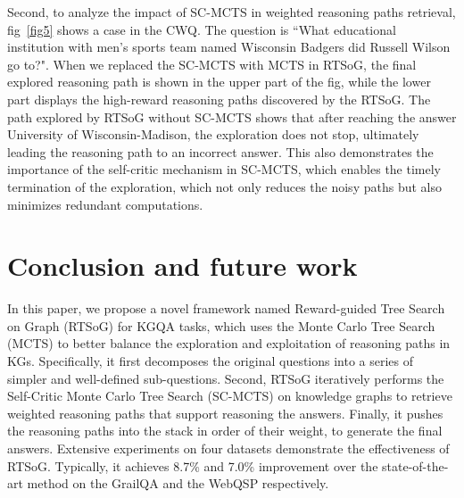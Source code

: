 \documentclass[lettersize,journal]{IEEEtran}
\begin{document}
Second, to analyze the impact of SC-MCTS in weighted reasoning paths retrieval, fig~\ref{fig5} shows a case in the CWQ. The question is ``What educational institution with men's sports team named Wisconsin Badgers did Russell Wilson go to?". When we replaced the SC-MCTS with MCTS in RTSoG, the final explored reasoning path is shown in the upper part of the fig, while the lower part displays the high-reward reasoning paths discovered by the RTSoG. The path explored by RTSoG without SC-MCTS shows that after reaching the answer University of Wisconsin-Madison, the exploration does not stop, ultimately leading the reasoning path to an incorrect answer. This also demonstrates the importance of the self-critic mechanism in SC-MCTS, which enables the timely termination of the exploration, which not only reduces the noisy paths but also minimizes redundant computations. 

\section{Conclusion and future work}
In this paper, we propose a novel framework named Reward-guided Tree Search on Graph (RTSoG) for KGQA tasks, which uses the Monte Carlo Tree Search (MCTS) to better balance the exploration and exploitation of reasoning paths in KGs. Specifically, it first decomposes the original questions into a series of simpler and well-defined sub-questions. Second, RTSoG iteratively performs the Self-Critic Monte Carlo Tree Search (SC-MCTS) on knowledge graphs to retrieve weighted reasoning paths that support reasoning the answers. Finally, it pushes the reasoning paths into the stack in order of their weight, to generate the final answers. Extensive experiments on four datasets demonstrate the effectiveness of RTSoG. Typically, it achieves 8.7\% and 7.0\% improvement over the state-of-the-art method on the GrailQA and the WebQSP respectively.








 
\end{document}
